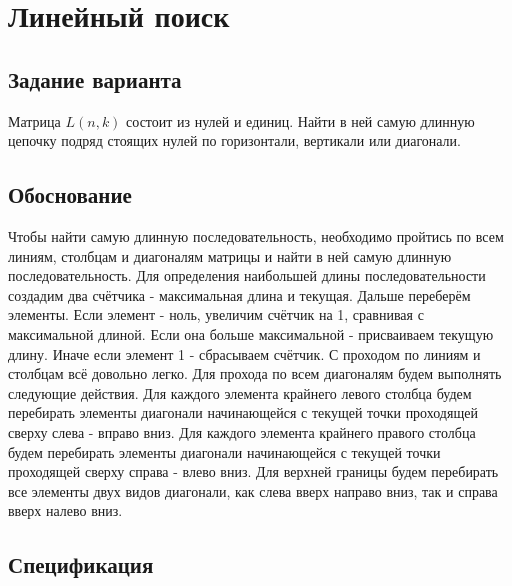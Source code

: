 \documentclass[a4paper, 12pt, oneside]{article}
\begin{document}
    \section{Линейный поиск}

    \subsection{Задание варианта}
    Матрица $L(n, k)$ состоит из нулей и единиц. Найти в ней самую длинную цепочку подряд стоящих нулей по горизонтали, вертикали или диагонали.

    \subsection{Обоснование}
    Чтобы найти самую длинную последовательность, необходимо пройтись по всем линиям, столбцам и диагоналям матрицы и найти в ней самую длинную последовательность.
    Для определения наибольшей длины последовательности создадим два счётчика - максимальная длина и текущая.
    Дальше переберём элементы.
    Если элемент - ноль, увеличим счётчик на 1, сравнивая с максимальной длиной.
    Если она больше максимальной - присваиваем текущую длину.
    Иначе если элемент 1 - сбрасываем счётчик.
    С проходом по линиям и столбцам всё довольно легко.
    Для прохода по всем диагоналям будем выполнять следующие действия.
    Для каждого элемента крайнего левого столбца будем перебирать элементы диагонали начинающейся с текущей точки проходящей сверху слева - вправо вниз.
    Для каждого элемента крайнего правого столбца будем перебирать элементы диагонали начинающейся с текущей точки проходящей сверху справа - влево вниз.
    Для верхней границы будем перебирать все элементы двух видов диагонали, как слева вверх направо вниз, так и справа вверх налево вниз.

    \subsection{Спецификация}
\end{document}
